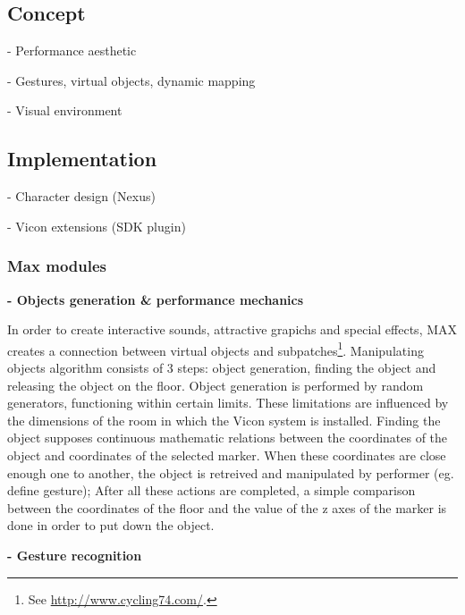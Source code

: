 \documentclass{nime-alternate}
\begin{document}
\subsection{Concept}

- Performance aesthetic

- Gestures, virtual objects, dynamic mapping

- Visual environment

\subsection{Implementation}
- Character design (Nexus)

- Vicon extensions (SDK plugin)

\subsubsection{Max modules}
\textbf{- Objects generation \& performance mechanics}\\ \par
In order to create interactive sounds, attractive grapichs and special effects, MAX creates a connection between virtual objects and subpatches\footnote{See \url{http://www.cycling74.com/}.}.
Manipulating objects algorithm consists of 3 steps: object generation, finding the object and releasing the object on the floor. Object generation is performed by random generators, functioning within certain limits. These limitations are influenced by the dimensions of the room in which the Vicon system is installed. Finding the object supposes continuous mathematic relations between the coordinates of the object and coordinates of the selected marker. When these coordinates are close enough one to another, the object is retreived and manipulated by performer (eg. define gesture); After all these actions are completed, a simple comparison between the coordinates of the floor and the value of the z axes of the marker is done in order to put down the object.\\ \par
\textbf{- Gesture recognition}\\ \par
\end{document}
